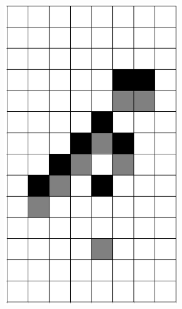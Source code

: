 \documentclass[12pt]{article}
\numberwithin{figure}{section} %
\begin{document}
\begin{figure}[H]
\begin{subfigure}{0.19\textwidth}
     \includegraphics[width=\linewidth]{Section4/17.2}
     \subcaption{}
   \end{subfigure}
           \begin{subfigure}{0.19\textwidth}
     \centering

\end{subfigure}
\end{figure}
\end{document}
